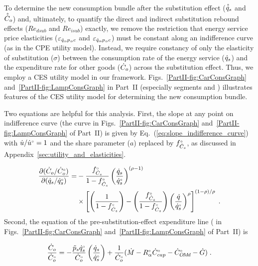 To determine the new consumption bundle after the substitution effect 
($\hat{\dot{q}}_s$ and $\hat{\dot{C}}_o$)
and,
ultimately, to quantify the direct and indirect substitution rebound effects
($Re_{dsub}$ and $Re_{isub}$) exactly,
we remove the restriction that energy service price elasticities ($\varepsilon_{\dot{q}_s\!,p_s\!,c}$ and $\varepsilon_{\dot{q}_o\!,p_s\!,c}$)
must be constant along an indifference curve (as in the CPE utility model).
Instead, we require constancy of only
the elasticity of substitution ($\sigma$) between
the consumption rate of the energy service ($\dot{q}_s$)
and the expenditure rate for other goods ($\dot{C}_o$)
across the substitution effect.
Thus, we employ a CES utility model in our framework.
Figs.~\ref{PartII-fig:CarConsGraph} 
and~\ref{PartII-fig:LampConsGraph} in Part~II
(especially segments \starc{} and \chat{})
illustrates features
of the CES utility model for determining the new consumption bundle.

Two equations are helpful for this analysis.
First, the slope at any point on indifference curve 
(the \iicirc{} curve in 
Figs.~\ref{PartII-fig:CarConsGraph} 
and~\ref{PartII-fig:LampConsGraph}
of Part~II)
is given by Eq.~(\ref{eq:slope_indifference_curve}) with 
$\dot{u}/{}{\dot{u}}^{\scriptscriptstyle \circ} = 1$ and 
the share parameter ($a$) replaced by ${}{f}^{\scriptscriptstyle \circ}_{\dot{C}_s}$,
as discussed in Appendix~\ref{sec:utility_and_elasticities}.

\begin{align} \label{eq:slope_indifference_curve_u1}
  \frac{\partial (\dot{C}_o/{}{\dot{C}}^{\scriptscriptstyle \circ}_o)}{\partial (\dot{q}_s/{}{\dot{q}}^{\scriptscriptstyle \circ}_s)} =&
        -\frac{{}{f}^{\scriptscriptstyle \circ}_{\dot{C}_s}}{1 - {}{f}^{\scriptscriptstyle \circ}_{\dot{C}_s}} \left( \frac{\dot{q}_s}{{}{\dot{q}}^{\scriptscriptstyle \circ}_s} \right)^{(\rho -1)} \nonumber  \\
        &\times \left[ \left( \frac{1}{1 - {}{f}^{\scriptscriptstyle \circ}_{\dot{C}_s}} \right) 
                - \left( \frac{{}{f}^{\scriptscriptstyle \circ}_{\dot{C}_s}}{1 - {}{f}^{\scriptscriptstyle \circ}_{\dot{C}_s}} \right) 
                          \left( \frac{\dot{q}}{{}{\dot{q}}^{\scriptscriptstyle \circ}_s} \right)^\rho \right]^{(1 - \rho)/\rho} \; .
\end{align}
%
Second, the equation of the pre-substitution-effect expenditure line 
(\starstar{} in 
Figs.~\ref{PartII-fig:CarConsGraph} 
and~\ref{PartII-fig:LampConsGraph}
of Part~II) is

\begin{equation} \label{eq:starstar_line}
  \frac{\dot{C}_o}{{}{\dot{C}}^{\scriptscriptstyle \circ}_o} = 
      -\frac{\tilde{p}_s {}{\dot{q}}^{\scriptscriptstyle \circ}_s}
            {{}{\dot{C}}^{\scriptscriptstyle \circ}_o}
        \left(  \frac{\dot{q}_s}{{}{\dot{q}}^{\scriptscriptstyle \circ}_s} \right)
      + \frac{1}{{}{\dot{C}}^{\scriptscriptstyle \circ}_o} 
        (\dot{M} - {}{R}^{\scriptscriptstyle \circ}_\alpha {}{\dot{C}}^{\scriptscriptstyle \circ}_{cap} - {}{\dot{C}}^{\scriptscriptstyle \circ}_{O\!M\!d} - \dot{G}) \; .
\end{equation}


